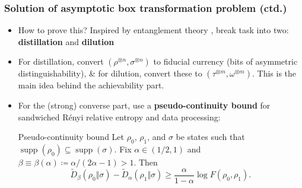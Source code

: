 \documentclass[usenames,dvipsnames,handout]{beamer}
\begin{document}
\begin{frame}
\frametitle{Solution of asymptotic box transformation problem (ctd.)}
\begin{itemize}

\pause
\item How to prove this? Inspired by entanglement theory \cite{BBPS96,BDSW96}, break task into two: {\color{MidnightBlue}\textbf{distillation}} and
{\color{MidnightBlue}\textbf{dilution}}

\pause
\vspace{.1in}
\item For distillation, convert $(\rho^{\otimes n},\sigma^{\otimes n})$ to fiducial currency (bits of asymmetric distinguishability), \& for dilution, convert these to $(\tau^{\otimes m},\omega^{\otimes m})$. This is the main idea behind the achievability part.

\pause
\vspace{.1in}
\item For the (strong) converse part, use a {\color{MidnightBlue}\textbf{pseudo-continuity bound}} for sandwiched R\'enyi relative entropy and data processing:
\pause
\begin{block}{Pseudo-continuity bound}
Let $\rho_{0}$, $\rho_{1}$, and
$\sigma$ be states such that $\operatorname{supp}(\rho_{0}%
)\subseteq\operatorname{supp}(\sigma)$. Fix $\alpha\in(1/2,1)$ and
$\beta\equiv\beta(\alpha)\coloneqq \alpha/\left(  2\alpha-1\right)  >1$. Then%
\begin{equation*}
\widetilde{D}_{\beta}(\rho_{0}\Vert\sigma)-\widetilde{D}_{\alpha}(\rho
_{1}\Vert\sigma)\geq\frac{\alpha}{1-\alpha}\log F(\rho_{0},\rho_{1}).
\end{equation*}
\end{block}

\end{itemize}

\end{frame}
\end{document}
